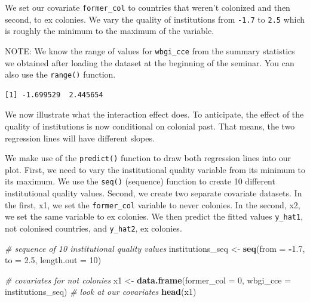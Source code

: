 \documentclass[]{article}
\newenvironment{Shaded}{\begin{snugshade}}{\end{snugshade}}
\newcommand{\KeywordTok}[1]{\textcolor[rgb]{0.13,0.29,0.53}{\textbf{#1}}}
\newcommand{\DataTypeTok}[1]{\textcolor[rgb]{0.13,0.29,0.53}{#1}}
\newcommand{\DecValTok}[1]{\textcolor[rgb]{0.00,0.00,0.81}{#1}}
\newcommand{\FloatTok}[1]{\textcolor[rgb]{0.00,0.00,0.81}{#1}}
\newcommand{\StringTok}[1]{\textcolor[rgb]{0.31,0.60,0.02}{#1}}
\newcommand{\CommentTok}[1]{\textcolor[rgb]{0.56,0.35,0.01}{\textit{#1}}}
\newcommand{\OperatorTok}[1]{\textcolor[rgb]{0.81,0.36,0.00}{\textbf{#1}}}
\newcommand{\NormalTok}[1]{#1}
\theoremstyle{definition}
\theoremstyle{definition}
\theoremstyle{definition}
\theoremstyle{remark}
\begin{document}
We set our covariate \texttt{former\_col} to countries that weren't
colonized and then second, to ex colonies. We vary the quality of
institutions from \texttt{-1.7} to \texttt{2.5} which is roughly the
minimum to the maximum of the variable.

NOTE: We know the range of values for \texttt{wbgi\_cce} from the
summary statistics we obtained after loading the dataset at the
beginning of the seminar. You can also use the \texttt{range()}
function.

\begin{Shaded}
\end{Shaded}

\begin{verbatim}
[1] -1.699529  2.445654
\end{verbatim}

We now illustrate what the interaction effect does. To anticipate, the
effect of the quality of institutions is now conditional on colonial
past. That means, the two regression lines will have different slopes.

We make use of the \texttt{predict()} function to draw both regression
lines into our plot. First, we need to vary the institutional quality
variable from its minimum to its maximum. We use the \texttt{seq()}
(sequence) function to create 10 different institutional quality values.
Second, we create two separate covariate datasets. In the first, x1, we
set the \texttt{former\_col} variable to never colonies. In the second,
x2, we set the same variable to ex colonies. We then predict the fitted
values \texttt{y\_hat1}, not colonised countries, and \texttt{y\_hat2},
ex colonies.

\begin{Shaded}
\begin{Highlighting}[]
\CommentTok{# sequence of 10 institutional quality values}
\NormalTok{institutions_seq <-}\StringTok{ }\KeywordTok{seq}\NormalTok{(}\DataTypeTok{from =} \OperatorTok{-}\FloatTok{1.7}\NormalTok{, }\DataTypeTok{to =} \FloatTok{2.5}\NormalTok{, }\DataTypeTok{length.out =} \DecValTok{10}\NormalTok{)}

\CommentTok{# covariates for not colonies}
\NormalTok{x1 <-}\StringTok{ }\KeywordTok{data.frame}\NormalTok{(}\DataTypeTok{former_col =} \DecValTok{0}\NormalTok{, }\DataTypeTok{wbgi_cce =}\NormalTok{ institutions_seq)}
\CommentTok{# look at our covariates}
\KeywordTok{head}\NormalTok{(x1)}
\end{Highlighting}
\end{Shaded}
\end{document}

